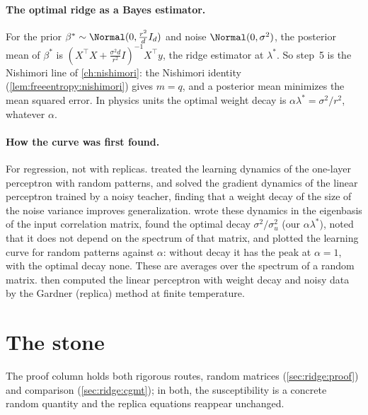 \begin{refsection}
\paragraph{The optimal ridge as a Bayes estimator.} For the prior $\beta^*\sim\Normal(0,\frac{r^2}dI_d)$ and noise $\Normal(0,\sigma^2)$, the posterior mean of $\beta^*$ is $(X^\top X+\frac{\sigma^2d}{r^2}I)^{-1}X^\top y$, the ridge estimator at $\lambda^*$. So step~5 is the Nishimori line of \cref{ch:nishimori}: the Nishimori identity (\cref{lem:freeentropy:nishimori}) gives $m=q$, and a posterior mean minimizes the mean squared error. In physics units the optimal weight decay is $\alpha\lambda^*=\sigma^2/r^2$, whatever $\alpha$.

\paragraph{How the curve was first found.} For regression, not with replicas. \textcite{HertzKroghThorbergsson1989} treated the learning dynamics of the one-layer perceptron with random patterns, and \textcite{KroghHertz1992} solved the gradient dynamics of the linear perceptron trained by a noisy teacher, finding that a weight decay of the size of the noise variance improves generalization. \textcite{KroghHertz1991} wrote these dynamics in the eigenbasis of the input correlation matrix, found the optimal decay $\sigma^2/\sigma_u^2$ (our $\alpha\lambda^*$), noted that it does not depend on the spectrum of that matrix, and plotted the learning curve for random patterns against $\alpha$: without decay it has the peak at $\alpha=1$, with the optimal decay none. These are averages over the spectrum of a random matrix. \textcite{DunmurWallace1993} then computed the linear perceptron with weight decay and noisy data by the Gardner (replica) method at finite temperature.

\section{The stone}\label{sec:ridge:stone}

The proof column holds both rigorous routes, random matrices (\cref{sec:ridge:proof}) and comparison (\cref{sec:ridge:cgmt}); in both, the susceptibility is a concrete random quantity and the replica equations reappear unchanged.


\end{refsection}
